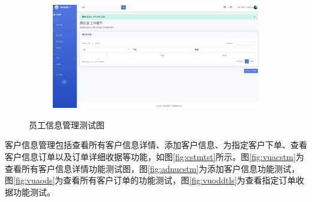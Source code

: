 \begin{figure}[H]
\begin{subfigure}{.45\textwidth}
        \label{fig:pyslr}
    \end{subfigure}
    \qquad
    \begin{subfigure}{.45\textwidth}
        \centering
        \includegraphics[width=\textwidth]{figures/6addwork.png}
        \label{fig:addwork}
    \end{subfigure}
    \caption{员工信息管理测试图}
    \label{fig:emploetest}
\end{figure}

客户信息管理包括查看所有客户信息详情、添加客户信息、为指定客户下单、查看客户信息订单以及订单详细收据等功能，如图\ref{fig:cstmtst}所示。图\ref{fig:vuacstm}为查看所有客户信息详情功能测试图，图\ref{fig:adnucstm}为添加客户信息功能测试，图\ref{fig:vuaods}为查看所有客户订单的功能测试，图\ref{fig:vuoddtls}为查看指定订单收据功能测试。

